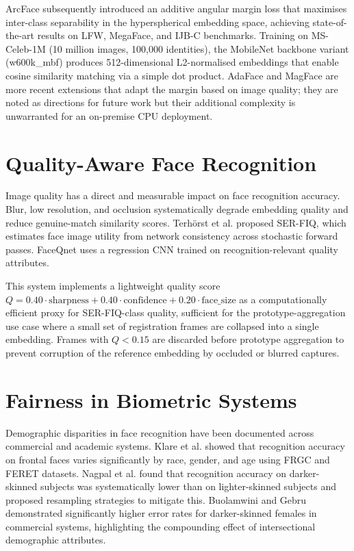 \documentclass[12pt,a4paper]{report}
\begin{document}
ArcFace \cite{deng2019arcface} subsequently introduced an additive angular margin loss that maximises inter-class separability in the hyperspherical embedding space, achieving state-of-the-art results on LFW, MegaFace, and IJB-C benchmarks. Training on MS-Celeb-1M \cite{guo2016msceleb} (10 million images, 100,000 identities), the MobileNet backbone variant (w600k\_mbf) produces 512-dimensional L2-normalised embeddings that enable cosine similarity matching via a simple dot product. AdaFace \cite{kim2022adaface} and MagFace \cite{meng2021magface} are more recent extensions that adapt the margin based on image quality; they are noted as directions for future work but their additional complexity is unwarranted for an on-premise CPU deployment.

\section{Quality-Aware Face Recognition}
Image quality has a direct and measurable impact on face recognition accuracy. Blur, low resolution, and occlusion systematically degrade embedding quality and reduce genuine-match similarity scores. Terh{\"o}rst et al. \cite{terhorst2020ser} proposed SER-FIQ, which estimates face image utility from network consistency across stochastic forward passes. FaceQnet \cite{hernandez2019faceqnet} uses a regression CNN trained on recognition-relevant quality attributes.

This system implements a lightweight quality score $Q = 0.40 \cdot \text{sharpness} + 0.40 \cdot \text{confidence} + 0.20 \cdot \text{face\_size}$ as a computationally efficient proxy for SER-FIQ-class quality, sufficient for the prototype-aggregation use case where a small set of registration frames are collapsed into a single embedding. Frames with $Q < 0.15$ are discarded before prototype aggregation to prevent corruption of the reference embedding by occluded or blurred captures.

\section{Fairness in Biometric Systems}
Demographic disparities in face recognition have been documented across commercial and academic systems. Klare et al. \cite{klare2012face} showed that recognition accuracy on frontal faces varies significantly by race, gender, and age using FRGC and FERET datasets. Nagpal et al. \cite{nagpal2019deep} found that recognition accuracy on darker-skinned subjects was systematically lower than on lighter-skinned subjects and proposed resampling strategies to mitigate this. Buolamwini and Gebru \cite{buolamwini2018gender} demonstrated significantly higher error rates for darker-skinned females in commercial systems, highlighting the compounding effect of intersectional demographic attributes.
\end{document}
